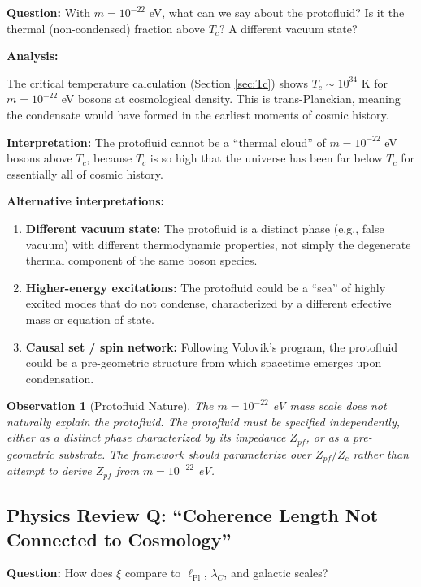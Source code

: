 \documentclass[11pt,a4paper]{article}
\newcommand{\lPl}{\ensuremath{\ell_{\mathrm{Pl}}}}
\newtheorem{observation}{Observation}
\begin{document}
\textbf{Question:} With $m = 10^{-22}$ eV, what can we say about the protofluid? Is it the thermal (non-condensed) fraction above $T_c$? A different vacuum state?

\textbf{Analysis:}

The critical temperature calculation (Section \ref{sec:Tc}) shows $T_c \sim 10^{34}$ K for $m = 10^{-22}$ eV bosons at cosmological density. This is trans-Planckian, meaning the condensate would have formed in the earliest moments of cosmic history.

\textbf{Interpretation:} The protofluid cannot be a ``thermal cloud'' of $m = 10^{-22}$ eV bosons above $T_c$, because $T_c$ is so high that the universe has been far below $T_c$ for essentially all of cosmic history.

\textbf{Alternative interpretations:}
\begin{enumerate}
    \item \textbf{Different vacuum state:} The protofluid is a distinct phase (e.g., false vacuum) with different thermodynamic properties, not simply the degenerate thermal component of the same boson species.
    \item \textbf{Higher-energy excitations:} The protofluid could be a ``sea'' of highly excited modes that do not condense, characterized by a different effective mass or equation of state.
    \item \textbf{Causal set / spin network:} Following Volovik's program, the protofluid could be a pre-geometric structure from which spacetime emerges upon condensation.
\end{enumerate}

\begin{observation}[Protofluid Nature]
The $m = 10^{-22}$ eV mass scale does not naturally explain the protofluid. The protofluid must be specified independently, either as a distinct phase characterized by its impedance $Z_{pf}$, or as a pre-geometric substrate. The framework should parameterize over $Z_{pf}/Z_c$ rather than attempt to derive $Z_{pf}$ from $m = 10^{-22}$ eV.
\end{observation}

\subsection{Physics Review Q: ``Coherence Length Not Connected to Cosmology''}

\textbf{Question:} How does $\xi$ compare to $\lPl$, $\lambda_C$, and galactic scales?
\end{document}
